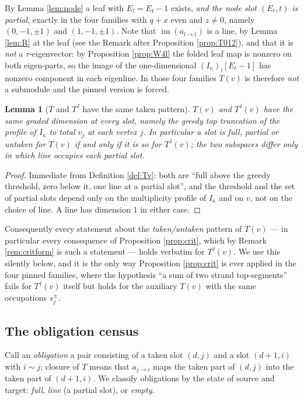 \documentclass[reqno]{amsart}
\theoremstyle{plain}
\newtheorem{lemma}[theorem]{Lemma}
\theoremstyle{definition}
\DeclareMathOperator{\im}{im}
\newcommand{\ka}{\kappa}
\begin{document}
By Lemma \ref{lem:node} a leaf with $E_l=E_t-1$ exists, \emph{and the node slot
$(E_t,t)$ is partial}, exactly in the four families with $q+x$ even and
$z\ne0$, namely $(0,-1,\pm1)$ and $(1,-1,\pm1)$.  Note that $\im(a_{l\to t})$ is
a line, by Lemma \ref{lem:R} at the leaf (see the Remark after Proposition
\ref{prop:T012}), and that it is \emph{not} a $\tau$-eigenvector: by
Proposition \ref{prop:W4l} the folded leaf map is nonzero on both eigen-parts,
so the image of the one-dimensional $(I_\ka)_l[E_t-1]$ has nonzero component in
each eigenline.  In those four families $T(v)$ is therefore \emph{not} a
submodule and the pinned version is forced.

\begin{lemma}[$T$ and $T^{\,l}$ have the same taken pattern]\label{lem:samepattern}
$T(v)$ and $T^{\,l}(v)$ have the same graded dimension at every slot, namely
the greedy top truncation of the profile of $I_\ka$ to total $v_j$ at each
vertex $j$.  In particular a slot is full, partial or untaken for $T(v)$ if and
only if it is so for $T^{\,l}(v)$; the two subspaces differ only in \emph{which}
line occupies each partial slot.
\end{lemma}

\begin{proof}
Immediate from Definition \ref{def:Tv}: both are ``full above the greedy
threshold, zero below it, one line at a partial slot'', and the threshold and
the set of partial slots depend only on the multiplicity profile of $I_\ka$
and on $v$, not on the choice of line.  A line has dimension $1$ in either
case.
\end{proof}

Consequently every statement about the \emph{taken/untaken} pattern of $T(v)$
--- in particular every consequence of Proposition \ref{prop:crit}, which by
Remark \ref{rem:critform} is such a statement --- holds verbatim for
$T^{\,l}(v)$.  We use this silently below, and it is the only way Proposition
\ref{prop:crit} is ever applied in the four pinned families, where the
hypothesis ``a sum of two strand top-segments'' fails for $T^{\,l}(v)$ itself
but holds for the auxiliary $T(v)$ with the same occupations $s^{\pm}_j$.

\subsection{The obligation census}
Call an \emph{obligation} a pair consisting of a taken slot $(d,j)$ and a slot
$(d+1,i)$ with $i\sim j$; closure of $T$ means that $a_{j\to i}$ maps the taken
part of $(d,j)$ into the taken part of $(d+1,i)$.  We classify obligations by
the state of source and target: \emph{full}, \emph{line} (a partial slot), or
\emph{empty}.
\end{document}
